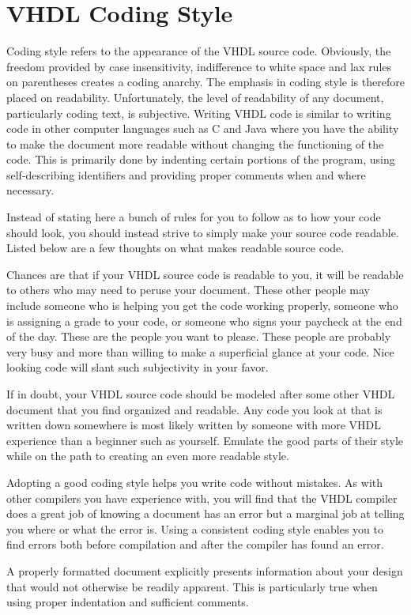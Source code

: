 \section{VHDL Coding Style}
Coding style refers to the appearance of the VHDL source code. Obviously, the freedom provided by case insensitivity, indifference to white space and lax rules on parentheses creates a coding anarchy. The emphasis in coding style is therefore placed on readability. Unfortunately, the level of readability of any document, particularly coding text, is subjective. Writing VHDL code is similar to writing code in other computer languages such as C and Java where you have the ability to make the document more readable without changing the functioning of the code. This is primarily done by indenting certain portions of the program, using self-describing identifiers and providing proper comments when and where necessary.

Instead of stating here a bunch of rules for you to follow as to how your code should look, you should instead strive to simply make your source code readable. Listed below are a few thoughts on what makes readable source code.

\begin{my_list}
\item Chances are that if your VHDL source code is readable to you, it will be readable to others who may need to peruse your document. These other people may include someone who is helping you get the code working properly, someone who is assigning a grade to your code, or someone who signs your paycheck at the end of the day. These are the people you want to please. These people are probably very busy and more than willing to make a superficial glance at your code. Nice looking code will slant such subjectivity in your favor.
\item If in doubt, your VHDL source code should be modeled after some other VHDL document that you find organized and readable. Any code you look at that is written down somewhere is most likely written by someone with more VHDL experience than a beginner such as yourself. Emulate the good parts of their style while on the path to creating an even more readable style.
\item Adopting a good coding style helps you write code without mistakes. As with other compilers you have experience with, you will find that the VHDL compiler does a great job of knowing a document has an error but a marginal job at telling you where or what the error is. Using a consistent coding style enables you to find errors both before compilation and after the compiler has found an error.
\item A properly formatted document explicitly presents information about your design that would not otherwise be readily apparent. This is particularly true when using proper indentation and sufficient comments.
\end{my_list}
\null\newpage
\thispagestyle{empty}



